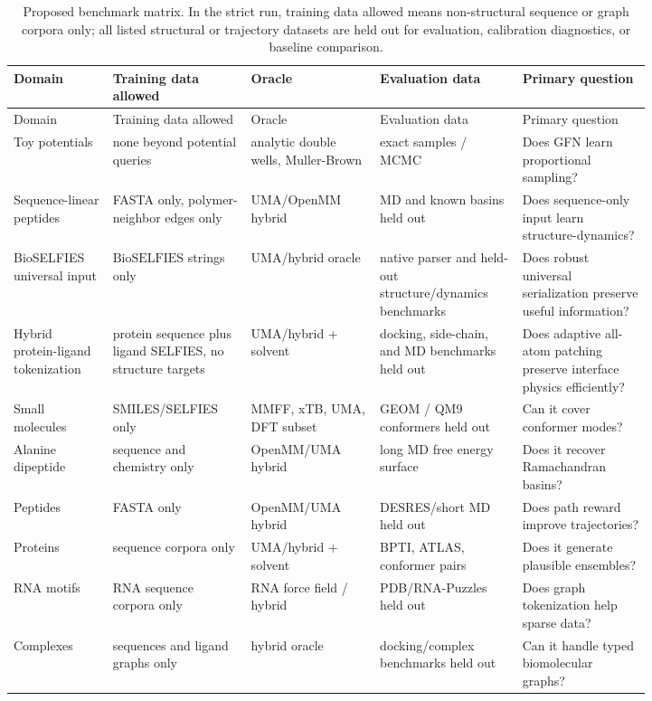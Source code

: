 \documentclass[11pt]{article}
\newcommand{\bioselfies}{\mathrm{BioSELFIES}}
\begin{document}
\begingroup
\small
\setlength{\tabcolsep}{3pt}
\begin{longtable}{p{0.13\linewidth}p{0.17\linewidth}p{0.17\linewidth}p{0.18\linewidth}p{0.17\linewidth}}
\caption{Proposed benchmark matrix. In the strict run, training data allowed means non-structural sequence or graph corpora only; all listed structural or trajectory datasets are held out for evaluation, calibration diagnostics, or baseline comparison.}\\
\toprule
Domain & Training data allowed & Oracle & Evaluation data & Primary question\\
\midrule
\endfirsthead
\toprule
Domain & Training data allowed & Oracle & Evaluation data & Primary question\\
\midrule
\endhead
Toy potentials & none beyond potential queries & analytic double wells, Muller-Brown & exact samples / MCMC & Does GFN learn proportional sampling?\\
Sequence-linear peptides & FASTA only, polymer-neighbor edges only & UMA/OpenMM hybrid & MD and known basins held out & Does sequence-only input learn structure-dynamics?\\
BioSELFIES universal input & $\bioselfies$ strings only & UMA/hybrid oracle & native parser and held-out structure/dynamics benchmarks & Does robust universal serialization preserve useful information?\\
Hybrid protein-ligand tokenization & protein sequence plus ligand SELFIES, no structure targets & UMA/hybrid + solvent & docking, side-chain, and MD benchmarks held out & Does adaptive all-atom patching preserve interface physics efficiently?\\
Small molecules & SMILES/SELFIES only & MMFF, xTB, UMA, DFT subset & GEOM / QM9 conformers held out & Can it cover conformer modes?\\
Alanine dipeptide & sequence and chemistry only & OpenMM/UMA hybrid & long MD free energy surface & Does it recover Ramachandran basins?\\
Peptides & FASTA only & OpenMM/UMA hybrid & DESRES/short MD held out & Does path reward improve trajectories?\\
Proteins & sequence corpora only & UMA/hybrid + solvent & BPTI, ATLAS, conformer pairs & Does it generate plausible ensembles?\\
RNA motifs & RNA sequence corpora only & RNA force field / hybrid & PDB/RNA-Puzzles held out & Does graph tokenization help sparse data?\\
Complexes & sequences and ligand graphs only & hybrid oracle & docking/complex benchmarks held out & Can it handle typed biomolecular graphs?\\
\bottomrule
\end{longtable}
\endgroup
\end{document}
